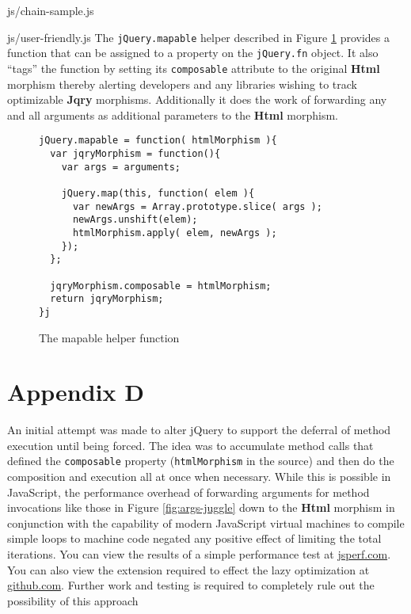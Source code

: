 \documentclass[preprint]{sigplanconf}
\begin{document}
\begin{lstinputlisting}[
    language=JavaScript,
    caption={Sources of Html objects},
    label={lst:chain-sample}
]{js/chain-sample.js}
\begin{lstinputlisting}[
    language=JavaScript,
    caption={User friendly overhead},
    label={lst:user-friendly}
]{js/user-friendly.js}
The \verb|jQuery.mapable| helper described in Figure \ref{fig:mapable} provides a function that can be assigned to a property on the \verb|jQuery.fn| object. It also ``tags'' the function by setting its \verb|composable| attribute to the original \textbf{Html} morphism thereby alerting developers and any libraries wishing to track optimizable \textbf{Jqry} morphisms. Additionally it does the work of forwarding any and all arguments as additional parameters to the \textbf{Html} morphism.

\begin{figure}[!ht]
\small
\begin{verbatim}
jQuery.mapable = function( htmlMorphism ){
  var jqryMorphism = function(){
    var args = arguments;

    jQuery.map(this, function( elem ){
      var newArgs = Array.prototype.slice( args );
      newArgs.unshift(elem);
      htmlMorphism.apply( elem, newArgs );
    });
  };

  jqryMorphism.composable = htmlMorphism;
  return jqryMorphism;
}j
\end{verbatim}
\nocaptionrule \caption{The mapable helper function}
\label{fig:mapable}
\end{figure}

\section{Appendix D}

An initial attempt was made to alter jQuery to support the deferral of method execution until being forced. The idea was to accumulate method calls that defined the \verb|composable| property (\verb|htmlMorphism| in the source) and then do the composition and execution all at once when necessary. While this is possible in JavaScript, the performance overhead of forwarding arguments for method invocations like those in Figure \ref{fig:args-juggle} down to the \textbf{Html} morphism in conjunction with the capability of modern JavaScript virtual machines to compile simple loops to machine code negated any positive effect of limiting the total iterations. You can view the results of a simple performance test at \href{http://jsperf.com/lazy-loop-fusion-vs-traditional-method-chaning/5}{jsperf.com}. You can also view the extension required to effect the lazy optimization at \href{https://github.com/johnbender/jquery-lazy-proxy/blob/79ab61e22547169d6f392512f782df2e29362ebc/lazy.js}{github.com}. Further work and testing is required to completely rule out the possibility of this approach


\end{lstinputlisting}
\end{lstinputlisting}
\end{document}
